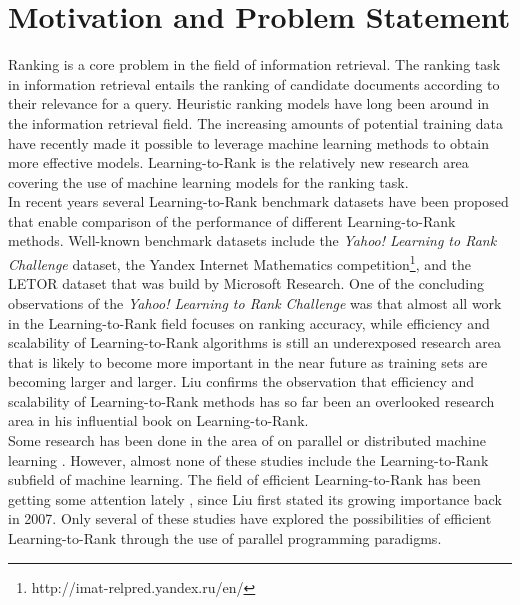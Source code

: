 \chapter{Motivation and Problem Statement}
Ranking is a core problem in the field of information retrieval. The ranking task in information retrieval entails the ranking of candidate documents according to their relevance for a query. Heuristic ranking models have long been around in the information retrieval field. The increasing amounts of potential training data have recently made it possible to leverage machine learning methods to obtain more effective models. Learning-to-Rank is the relatively new research area covering the use of machine learning models for the ranking task.\\

In recent years several Learning-to-Rank benchmark datasets have been proposed that enable comparison of the performance of different Learning-to-Rank methods. Well-known benchmark datasets include the \emph{Yahoo! Learning to Rank Challenge} dataset\cite{Chapelle2011a}, the Yandex Internet Mathematics competition\footnote{http://imat-relpred.yandex.ru/en/}, and the LETOR dataset\cite{Qin2010} that was build by Microsoft Research. One of the concluding observations of the \emph{Yahoo! Learning to Rank Challenge} was that almost all work in the Learning-to-Rank field focuses on ranking accuracy, while efficiency and scalability of Learning-to-Rank algorithms is still an underexposed research area that is likely to become more important in the near future as training sets are becoming larger and larger\cite{Chapelle2011b}. Liu\cite{Liu2007} confirms the observation that efficiency and scalability of Learning-to-Rank methods has so far been an overlooked research area in his influential book on Learning-to-Rank.\\

Some research has been done in the area of on parallel or distributed machine learning \cite{Chu2007,Chang2007}. However, almost none of these studies include the Learning-to-Rank subfield of machine learning. The field of efficient Learning-to-Rank has been getting some attention lately \cite{Asadi2013a,Asadi2013b,Busa-Fekete2012,Sousa2012,Shukla2012}, since Liu \cite{Liu2007} first stated its growing importance back in 2007. Only several of these studies \cite{Sousa2012,Shukla2012} have explored the possibilities of efficient Learning-to-Rank through the use of parallel programming paradigms.\\

